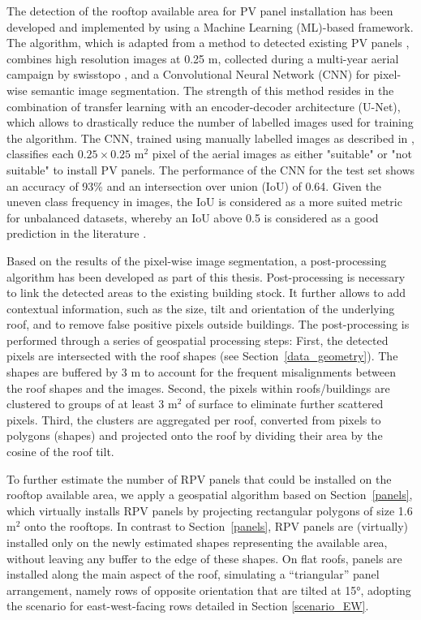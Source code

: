 The detection of the rooftop available area for PV panel installation has been developed and implemented by \citet{castello_quantification_2021} using a Machine Learning (ML)-based framework. 
The algorithm, which is adapted from a method to detected existing PV panels \cite{castello_deep_2019}, combines high resolution images at 0.25 m, collected during a multi-year aerial campaign by swisstopo \cite{swiss_federal_institue_of_topography_swisstopo_swissimage_nodate}, and a Convolutional Neural Network (CNN) for pixel-wise semantic image segmentation. The strength of this method resides in the combination of transfer learning with an encoder-decoder architecture (U-Net), which allows to drastically reduce the number of labelled images used for training the algorithm. 
The CNN, trained using manually labelled images as described in \cite{castello_quantification_2021}, classifies each $0.25 \times 0.25$ m$^2$ pixel of the aerial images as either "suitable" or "not suitable" to install PV panels. 
The performance of the CNN for the test set shows an accuracy of 93\% and an intersection over union (IoU) of 0.64. Given the uneven class frequency in images, the IoU is considered as a more suited metric for unbalanced datasets, whereby an IoU above 0.5 is considered as a good prediction in the literature \cite{castello_quantification_2021}.

Based on the results of the pixel-wise image segmentation, a post-processing algorithm has been developed as part of this thesis.
Post-processing is necessary to link the detected areas to the existing building stock. It further allows to add contextual information, such as the size, tilt and orientation of the underlying roof, and to remove false positive pixels outside buildings. The post-processing is performed through a series of geospatial processing steps: First, the detected pixels are intersected with the roof shapes (see Section~\ref{data_geometry}). The shapes are buffered by 3 m to account for the frequent misalignments between the roof shapes and the images. Second, the pixels within roofs/buildings are clustered to groups of at least 3 m$^2$ of surface to eliminate further scattered pixels. Third, the clusters are aggregated per roof, converted from pixels to polygons (shapes) and projected onto the roof by dividing their area by the cosine of the roof tilt.

To further estimate the number of RPV panels that could be installed on the rooftop available area, we apply a geospatial algorithm based on Section~\ref{panels}, which virtually installs RPV panels by projecting rectangular polygons of size 1.6 m$^2$ onto the rooftops. In contrast to Section~\ref{panels}, RPV panels are (virtually) installed only on the newly estimated shapes representing the available area, without leaving any buffer to the edge of these shapes. On flat roofs, panels are installed along the main aspect of the roof, simulating a “triangular” panel arrangement, namely rows of opposite orientation that are tilted at 15°, adopting the scenario for east-west-facing rows detailed in Section \ref{scenario_EW}.

